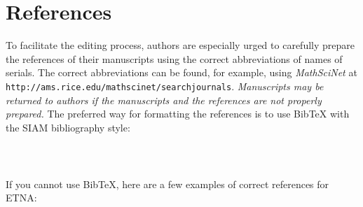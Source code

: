 \documentclass{scrartcl}
\begin{document}
\section{References}
To facilitate the editing process, authors are especially urged to carefully
prepare the references of their manuscripts using the correct abbreviations of
names of serials. The correct abbreviations can be found, for example, using
\emph{MathSciNet} at \texttt{http://ams.rice.edu/mathscinet/searchjournals}.
%
\emph{Manuscripts may be returned to authors if the manuscripts and the
references are not properly prepared.} The preferred way for formatting the
references is to use BibTeX with the SIAM bibliography style:

\begin{center}\begin{verbatim}
         
         
\end{verbatim}\end{center}
%
If you cannot use BibTeX, here are a few examples of correct references for
ETNA:
\end{document}
